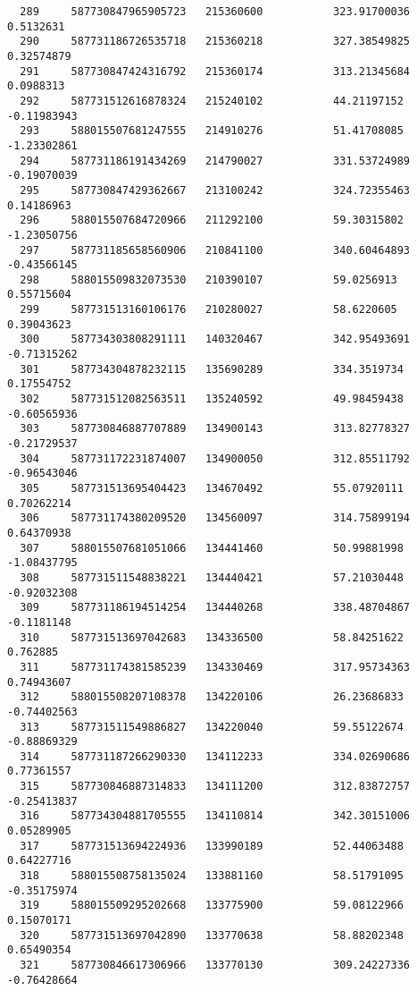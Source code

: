 \documentclass[a4paper,11pt]{article}
\begin{document}
\begin{verbatim}
  289     587730847965905723   215360600           323.91700036   0.5132631    
  290     587731186726535718   215360218           327.38549825   0.32574879   
  291     587730847424316792   215360174           313.21345684   0.0988313    
  292     587731512616878324   215240102           44.21197152    -0.11983943  
  293     588015507681247555   214910276           51.41708085    -1.23302861  
  294     587731186191434269   214790027           331.53724989   -0.19070039  
  295     587730847429362667   213100242           324.72355463   0.14186963   
  296     588015507684720966   211292100           59.30315802    -1.23050756  
  297     587731185658560906   210841100           340.60464893   -0.43566145  
  298     588015509832073530   210390107           59.0256913     0.55715604   
  299     587731513160106176   210280027           58.6220605     0.39043623   
  300     587734303808291111   140320467           342.95493691   -0.71315262  
  301     587734304878232115   135690289           334.3519734    0.17554752   
  302     587731512082563511   135240592           49.98459438    -0.60565936  
  303     587730846887707889   134900143           313.82778327   -0.21729537  
  304     587731172231874007   134900050           312.85511792   -0.96543046  
  305     587731513695404423   134670492           55.07920111    0.70262214   
  306     587731174380209520   134560097           314.75899194   0.64370938   
  307     588015507681051066   134441460           50.99881998    -1.08437795  
  308     587731511548838221   134440421           57.21030448    -0.92032308  
  309     587731186194514254   134440268           338.48704867   -0.1181148   
  310     587731513697042683   134336500           58.84251622    0.762885     
  311     587731174381585239   134330469           317.95734363   0.74943607   
  312     588015508207108378   134220106           26.23686833    -0.74402563  
  313     587731511549886827   134220040           59.55122674    -0.88869329  
  314     587731187266290330   134112233           334.02690686   0.77361557   
  315     587730846887314833   134111200           312.83872757   -0.25413837  
  316     587734304881705555   134110814           342.30151006   0.05289905   
  317     587731513694224936   133990189           52.44063488    0.64227716   
  318     588015508758135024   133881160           58.51791095    -0.35175974  
  319     588015509295202668   133775900           59.08122966    0.15070171   
  320     587731513697042890   133770638           58.88202348    0.65490354   
  321     587730846617306966   133770130           309.24227336   -0.76428664  

\end{verbatim}
\end{document}
